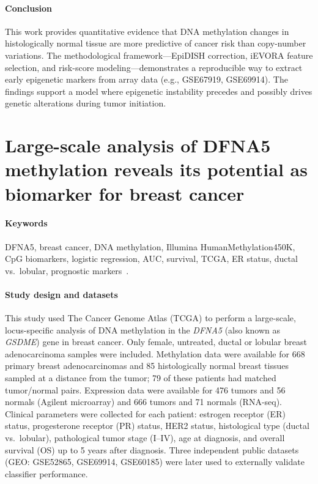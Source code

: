 \documentclass[10pt]{extarticle}
\begin{document}
\paragraph{Conclusion}
This work provides quantitative evidence that DNA methylation changes in histologically normal tissue are more predictive of cancer risk than copy-number variations. The methodological framework—EpiDISH correction, iEVORA feature selection, and risk-score modeling—demonstrates a reproducible way to extract early epigenetic markers from array data (e.g., GSE67919, GSE69914). The findings support a model where epigenetic instability precedes and possibly drives genetic alterations during tumor initiation.

\section{Large-scale analysis of DFNA5 methylation reveals its potential as biomarker for breast cancer}

\paragraph{Keywords}
DFNA5, breast cancer, DNA methylation, Illumina HumanMethylation450K, CpG biomarkers, logistic regression, AUC, survival, TCGA, ER status, ductal vs.\ lobular, prognostic markers~\cite{croes2018dfna5}.

\paragraph{Study design and datasets}
This study used The Cancer Genome Atlas (TCGA) to perform a large-scale, locus-specific analysis of DNA methylation in the \textit{DFNA5} (also known as \textit{GSDME}) gene in breast cancer. Only female, untreated, ductal or lobular breast adenocarcinoma samples were included. Methylation data were available for 668 primary breast adenocarcinomas and 85 histologically normal breast tissues sampled at a distance from the tumor; 79 of these patients had matched tumor/normal pairs. Expression data were available for 476 tumors and 56 normals (Agilent microarray) and 666 tumors and 71 normals (RNA-seq). Clinical parameters were collected for each patient: estrogen receptor (ER) status, progesterone receptor (PR) status, HER2 status, histological type (ductal vs.\ lobular), pathological tumor stage (I--IV), age at diagnosis, and overall survival (OS) up to 5 years after diagnosis. Three independent public datasets (GEO: GSE52865, GSE69914, GSE60185) were later used to externally validate classifier performance.
\end{document}
